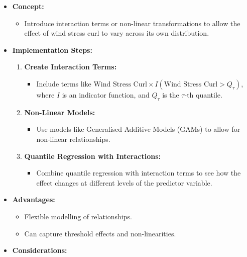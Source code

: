 \documentclass[
  letterpaper,
]{book}
\providecommand{\tightlist}{%
  \setlength{\itemsep}{0pt}\setlength{\parskip}{0pt}}\usepackage{longtable,booktabs,array}
\begin{document}
\begin{enumerate}
  \begin{itemize}
  \tightlist
  \item
    \textbf{Concept:}

    \begin{itemize}
    \tightlist
    \item
      Introduce interaction terms or non-linear transformations to allow
      the effect of wind stress curl to vary across its own
      distribution.
    \end{itemize}
  \item
    \textbf{Implementation Steps:}

    \begin{enumerate}
    \def\labelenumii{\arabic{enumii}.}
    \tightlist
    \item
      \textbf{Create Interaction Terms:}

      \begin{itemize}
      \tightlist
      \item
        Include terms like
        \(\text{Wind Stress Curl} \times I(\text{Wind Stress Curl} > Q_{\tau})\),
        where \(I\) is an indicator function, and \(Q_{\tau}\) is the
        \(\tau\)-th quantile.
      \end{itemize}
    \item
      \textbf{Non-Linear Models:}

      \begin{itemize}
      \tightlist
      \item
        Use models like Generalised Additive Models (GAMs) to allow for
        non-linear relationships.
      \end{itemize}
    \item
      \textbf{Quantile Regression with Interactions:}

      \begin{itemize}
      \tightlist
      \item
        Combine quantile regression with interaction terms to see how
        the effect changes at different levels of the predictor
        variable.
      \end{itemize}
    \end{enumerate}
  \item
    \textbf{Advantages:}

    \begin{itemize}
    \tightlist
    \item
      Flexible modelling of relationships.
    \item
      Can capture threshold effects and non-linearities.
    \end{itemize}
  \item
    \textbf{Considerations:}


\end{itemize}
\end{enumerate}
\end{document}
